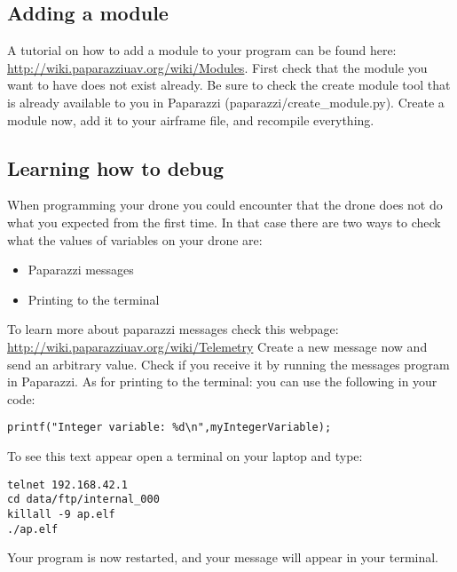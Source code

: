 \documentclass{article}
\begin{document}
\subsection*{Adding a module}
A tutorial on how to add a module to your program can be found here: \url{http://wiki.paparazziuav.org/wiki/Modules}.
First check that the module you want to have does not exist already. Be sure to check the create module tool that is already available to you in Paparazzi (paparazzi/create\_module.py). 
Create a module now, add it to your airframe file, and recompile everything. 

\subsection*{Learning how to debug}
When programming your drone you could encounter that the drone does not do what you expected from the first time. In that case there are two ways to check what the values of variables on your drone are:
\begin{itemize}
	\item Paparazzi messages
	\item Printing to the terminal
\end{itemize}
To learn more about paparazzi messages check this webpage: \url{http://wiki.paparazziuav.org/wiki/Telemetry}
Create a new message now and send an arbitrary value. Check if you receive it by running the messages program in Paparazzi. 
As for printing to the terminal: you can use the following in your code:

\begin{verbatim}
printf("Integer variable: %d\n",myIntegerVariable);
\end{verbatim}
To see this text appear open a terminal on your laptop and type:
\begin{verbatim}
telnet 192.168.42.1
cd data/ftp/internal_000
killall -9 ap.elf 
./ap.elf
\end{verbatim}
Your program is now restarted, and your message will appear in your terminal. 
\end{document}
